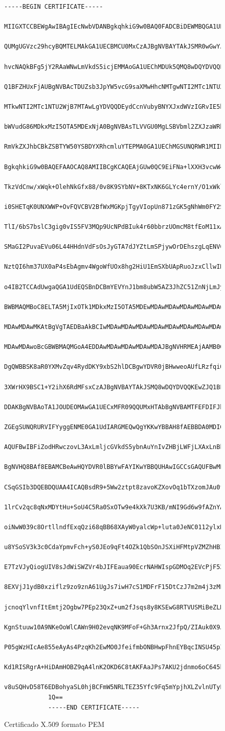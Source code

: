 \documentclass[
    article,            %
    11pt,               %
    oneside,            %
    a4paper,            %
    english,            %
    brazil,             %
    sumario=tradicional,
    ]{abntex2}
\begin{document}
\begin{figure}[H]
    \centering
    \caption{Certificado X.509 formato PEM}
    \label{fig6}
    \begin{Verbatim}[frame=single, commandchars=\\\{\}, fontsize=\footnotesize]
            -----BEGIN CERTIFICATE-----
            MIIGXTCCBEWgAwIBAgIEcNwbVDANBgkqhkiG9w0BAQ0FADCBiDEWMBQGA1UEAxMN
            QUMgUGVzc29hcyBQMTELMAkGA1UECBMCU0MxCzAJBgNVBAYTAkJSMR0wGwYJKoZI
            hvcNAQkBFg5jY2RAaWNwLmVkdS5icjEMMAoGA1UEChMDUk5QMQ8wDQYDVQQLEwZJ
            Q1BFZHUxFjAUBgNVBAcTDUZsb3JpYW5vcG9saXMwHhcNMTgwNTI2MTc1NTU2WhcN
            MTkwNTI2MTc1NTU2WjB7MTAwLgYDVQQDEydCcnVubyBNYXJxdWVzIGRvIE5hc2Np
            bWVudG86MDkxMzI5OTA5MDExNjA0BgNVBAsTLVVGU0MgLSBVbml2ZXJzaWRhZGUg
            RmVkZXJhbCBkZSBTYW50YSBDYXRhcmluYTEPMA0GA1UEChMGSUNQRWR1MIIBIjAN
            BgkqhkiG9w0BAQEFAAOCAQ8AMIIBCgKCAQEAjGUw0QC9EiFNa+lXXH3vcwW4l3dM
            TkzVdCnw/xWqk+OlehNkGfx88/0v8K9SYbNV+8KTxNK6GLYc4ernY/O1xWklvbxG
            i0SHETqK0UNXWWP+OvFQVCBV2BfWxMGKpjTgyVIopUn871zGK5gNhWm0FY2SQL8S
            TlI/6bS7bslC3gig0vIS5FV3MQp9UcNPdBIuk4r60bbrzUOmcM8tfEoM11xA3T8n
            SMaGI2PuvaEVu06L44HHdnVdFsOsJyGTA7dJYZtLmSPjywOrDEhszgLqENVCPn6z
            NztQI6hm37UX0aP4sEbAgmv4WgoWfUOx8hg2HiU1EmSXbUApRuoJzxCllwIDAQAB
            o4IB2TCCAdUwgaQGA1UdEQSBnDCBmYEVYnJ1bm8ubW5AZ3JhZC51ZnNjLmJyoDgG
            BWBMAQMBoC8ELTA5MjIxOTk1MDkxMzI5OTA5MDEwMDAwMDAwMDAwMDAwMDAwMDAw
            MDAwMDAwMKAtBgVgTAEDBaAkBCIwMDAwMDAwMDAwMDAwMDAwMDAwMDAwMDAwMDAw
            MDAwMDAwoBcGBWBMAQMGoA4EDDAwMDAwMDAwMDAwMDAJBgNVHRMEAjAAMB0GA1Ud
            DgQWBBSK8aR0YXMvZqv4RydDKY9xbS2hlDCBgwYDVR0jBHwweoAUfLRzfqiQ0Iwj
            3XWrHX9BSC1+Y2ihX6RdMFsxCzAJBgNVBAYTAkJSMQ8wDQYDVQQKEwZJQ1BFRFUx
            DDAKBgNVBAoTA1JOUDEOMAwGA1UECxMFR09QQUMxHTAbBgNVBAMTFEFDIFJhaXog
            ZGEgSUNQRURVIFYyggENME0GA1UdIARGMEQwQgYKKwYBBAH8fAEBBDA0MDIGCCsG
            AQUFBwIBFiZodHRwczovL3AxLmljcGVkdS5ybnAuYnIvZHBjLWFjLXAxLnBkZjAO
            BgNVHQ8BAf8EBAMCBeAwHQYDVR0lBBYwFAYIKwYBBQUHAwIGCCsGAQUFBwMEMA0G
            CSqGSIb3DQEBDQUAA4ICAQBsdR9+5Ww2ztpt8zavoKZXovOq1bTXzomJAu0fhIIv
            1lrCv2qc8qNxMDYtHu+SoU4C5Ra0SxOTw9e4kXk7U3KB/mNI9Gd6w9fAZnYAKW6F
            oiNwW039c8OrtllndfExqQzi68qBB68XAyW0yalcWp+luta0JeNC0112ylxNBpjY
            u8YSoSV3k3c0CdaYpmvFch+yS0JEo9qFt4OZk1QbSOnJSXiHFMtpVZMZhHBIjYHr
            E7TzVJyQiogUIV8sJdWiSWZVr4bJIFEaua90EcrNAHWIspGDMOq2EVcPjF52qtRZ
            8EXVjJ1ydB0xziflz9zo9znA61UgJs7iwH7cS1MDFrF15DtCzJ7m2m4j3zMLMKeU
            jcnoqYlvnfItEmtj2Ogbw7PEp23QxZ+um2fJsqs8y8KSEwG8RTVUSMiBeZLNveV2
            KgnStuuw10A9NKeOoWlCAWn9H02evqNK9MFoF+Gh3Arnx2JfpQ/ZIAuk0X9JmAW7
            P05gWzHIcAe855eAyAs4PzqKh2EwMO0JfeifmbONBHwpFhnEYBqcINSU45pIAE8D
            Kd1RISRgrA+HiDAmHOBZ9qA4lnK2OKD6C8tAKFAaJPs7AKU2jdnmo6oC645kfUNE
            v8uSQHvD58T6EDBohyaSL0hjBCFmW5NRLTEZ35Yfc9Fq5mYpjhXLZvlnUTyLo6K+
            1Q==
            -----END CERTIFICATE-----
    \end{Verbatim}
\end{figure}
\end{document}
